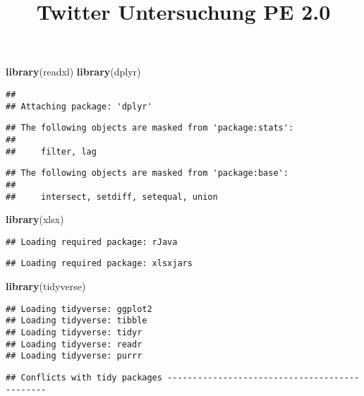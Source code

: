 \documentclass[]{article}
\title{Twitter Untersuchung PE 2.0}
\author{}
\date{}
\newenvironment{Shaded}{\begin{snugshade}}{\end{snugshade}}
\newcommand{\KeywordTok}[1]{\textcolor[rgb]{0.13,0.29,0.53}{\textbf{{#1}}}}
\newcommand{\NormalTok}[1]{{#1}}
\begin{document}
\maketitle

{
\setcounter{tocdepth}{4}
\tableofcontents
}
\begin{Shaded}
\begin{Highlighting}[]
\KeywordTok{library}\NormalTok{(readxl)}
\KeywordTok{library}\NormalTok{(dplyr)}
\end{Highlighting}
\end{Shaded}

\begin{verbatim}
## 
## Attaching package: 'dplyr'
\end{verbatim}

\begin{verbatim}
## The following objects are masked from 'package:stats':
## 
##     filter, lag
\end{verbatim}

\begin{verbatim}
## The following objects are masked from 'package:base':
## 
##     intersect, setdiff, setequal, union
\end{verbatim}

\begin{Shaded}
\begin{Highlighting}[]
\KeywordTok{library}\NormalTok{(xlsx)}
\end{Highlighting}
\end{Shaded}

\begin{verbatim}
## Loading required package: rJava
\end{verbatim}

\begin{verbatim}
## Loading required package: xlsxjars
\end{verbatim}

\begin{Shaded}
\begin{Highlighting}[]
\KeywordTok{library}\NormalTok{(tidyverse)}
\end{Highlighting}
\end{Shaded}

\begin{verbatim}
## Loading tidyverse: ggplot2
## Loading tidyverse: tibble
## Loading tidyverse: tidyr
## Loading tidyverse: readr
## Loading tidyverse: purrr
\end{verbatim}

\begin{verbatim}
## Conflicts with tidy packages ----------------------------------------------
\end{verbatim}
\end{document}
